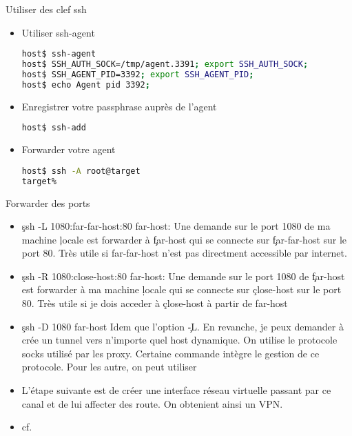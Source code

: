 \begin{frame}[fragile=singleslide]{Utiliser des clef ssh}
  \begin{itemize}
  \item Utiliser ssh-agent
    \begin{lstlisting}[language=sh]
host$ ssh-agent
host$ SSH_AUTH_SOCK=/tmp/agent.3391; export SSH_AUTH_SOCK;
host$ SSH_AGENT_PID=3392; export SSH_AGENT_PID;
host$ echo Agent pid 3392;
    \end{lstlisting} %
  \item Enregistrer votre passphrase auprès de l'agent
    \begin{lstlisting}[language=sh]
host$ ssh-add
    \end{lstlisting} %
  \item Forwarder votre agent
    \begin{lstlisting}[language=sh]
host$ ssh -A root@target
target%
    \end{lstlisting} %
  \end{itemize}
\end{frame}

\begin{frame}[fragile=singleslide]{Forwarder des ports}
  \begin{itemize}
  \item \c{ssh  -L 1080:far-far-host:80 far-host}: Une  demande sur le
    port 1080  de ma machine  \c{locale} est forwarder  à \c{far-host}
    qui se connecte sur \c{far-far-host} sur le port 80. Très utile si
    far-far-host n'est pas directment accessible par internet.
  \item  \c{ssh -R  1080:close-host:80 far-host}:  Une demande  sur le
    port 1080  de \c{far-host} est  forwarder à ma  machine \c{locale}
    qui se connecte  sur \c{close-host} sur le port  80. Très utile si
    je dois acceder à \c{close-host} à partir de far-host
  \item  \c{ssh  -D  1080  far-host}  Idem  que  l'option  \c{-L}.  En
    revanche, je  peux demander à  crée un tunnel vers  n'importe quel
    host  dynamique. On  utilise le  protocole socks  utilisé  par les
    proxy. Certaine commande intègre  le gestion de ce protocole. Pour
    les autre, on peut utiliser 
  \item L'étape  suivante est de créer une  interface réseau virtuelle
    passant par  ce canal et de  lui affecter des  route. On obtenient
    ainsi un VPN.
    \item cf. 
  \end{itemize}
\end{frame}

